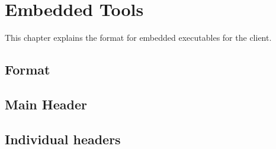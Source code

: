 \chapter{Embedded Tools}
This chapter explains the format for embedded executables for the client.

\section{Format}

\section{Main Header}

\section{Individual headers}